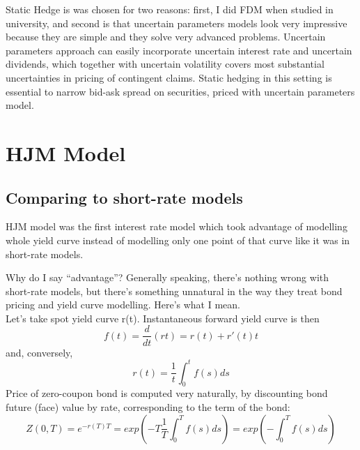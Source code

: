 \documentclass[11pt]{article} %
\begin{document}
Static Hedge is was chosen for two reasons: first, I did FDM when studied in university, and second is that uncertain parameters models look very impressive because they are simple and they solve very advanced problems. Uncertain parameters approach can easily incorporate uncertain interest rate and uncertain dividends, which together with uncertain volatility covers most substantial uncertainties in pricing of contingent claims. Static hedging in this setting is essential to narrow bid-ask spread on securities, priced with uncertain parameters model.

\section{HJM Model}

\subsection{Comparing to short-rate models}

HJM model was the first interest rate model which took advantage of modelling whole yield curve instead of modelling only one point of that curve like it was in short-rate models.

Why do I say ``advantage''? Generally speaking, there's nothing wrong with short-rate models, but there's something unnatural in the way they treat bond pricing and yield curve modelling. Here's what I mean.\\
Let's take spot yield curve r(t). Instantaneous forward yield curve is then %
\begin{equation}
f(t) = \frac{d}{dt}(rt) = r(t) + r'(t) t
\end{equation}
and, conversely, 
\begin{equation}
r(t) = \frac{1}{t}\int_{0}^{t}{f(s)ds}
\end{equation}
Price of zero-coupon bond is computed very naturally, by discounting bond future (face) value by rate, corresponding to the term of the bond:
\begin{equation} \label{eq:truebondprice}
Z(0,T) = e^{-r(T)T} = exp\left(-T\frac{1}{T}\int_{0}^{T}{f(s)ds}\right) = exp\left(-\int_{0}^{T}{f(s)ds}\right)
\end{equation}
\end{document}
